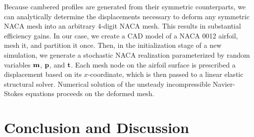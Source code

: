 \documentclass[11pt]{article}
\begin{document}
Because cambered profiles are generated from their symmetric counterparts, we can analytically determine the displacements necessary to deform any symmetric NACA mesh into an arbitrary 4-digit NACA mesh. This results in substantial efficiency gains. In our case, we create a CAD model of a NACA 0012 airfoil, mesh it, and partition it once. Then, in the initialization stage of a new simulation, we generate a stochastic NACA realization parameterized by random variables $\mb{m}$, $\mb{p}$, and $\mb{t}$. Each mesh node on the airfoil surface is prescribed a displacement based on its $x$-coordinate, which is then passed to a linear elastic structural solver. Numerical solution of the unsteady incompressible Navier-Stokes equations proceeds on the deformed mesh.

\section{Conclusion and Discussion}

\label{lastpage}
\end{document}

